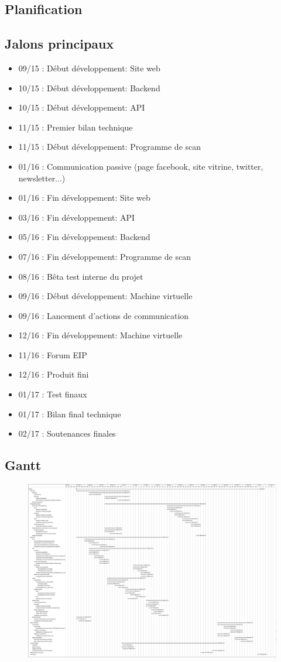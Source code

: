\textcolor{myBlue}{\chapter{Planification}}
\section{Jalons principaux}
\begin{itemize}
\item 09/15 : Début développement: Site web
\item 10/15 : Début développement: Backend
\item 10/15 : Début développement: API
\item 11/15 : Premier bilan technique
\item 11/15 : Début développement: Programme de scan
\item 01/16 : Communication passive (page facebook, site vitrine, twitter, newsletter...)
\item 01/16 : Fin développement: Site web
\item 03/16 : Fin développement: API
\item 05/16 : Fin développement: Backend
\item 07/16 : Fin développement: Programme de scan
\item 08/16 : Bêta test interne du projet
\item 09/16 : Début développement: Machine virtuelle
\item 09/16 : Lancement d’actions de communication
\item 12/16 : Fin développement: Machine virtuelle
\item 11/16 : Forum EIP
\item 12/16 : Produit fini
\item 01/17 : Test finaux
\item 01/17 : Bilan final technique
\item 02/17 : Soutenances finales
\end{itemize}
\section{Gantt}


\begin{figure}
\includegraphics[width=18cm]{vigilate-gantt.png}
\end{figure}
